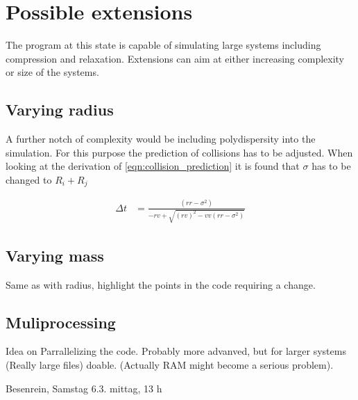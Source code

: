 
\section{Possible extensions}
\label{sec:simulation_ext}
The program at this state is capable of simulating large systems including compression and relaxation. Extensions can aim at either increasing complexity or size of the systems. 

\subsection{Varying radius}
\label{sec:extension_radius}
A further notch of complexity would be including polydispersity into the simulation. For this purpose the prediction of collisions has to be adjusted. When looking at the derivation of \autoref{eqn:collision_prediction} it is found that $\sigma$ has to be changed to $R_i+R_j$ 

\begin{align}
\label{eqn:collision_prediction}
\Delta t &= \frac{(rr - \sigma^2 )}{ - rv + \sqrt{ (rv)^2  - vv (rr - \sigma^2 )}}
\end{align} 


\subsection{Varying mass}
\label{sec:extension_mass}
Same as with radius, highlight the points in the code requiring a change.

\subsection{Muliprocessing}
\label{sec:extension_MP}
Idea on Parrallelizing the code. Probably more advanved, but for larger systems (Really large files) doable. (Actually RAM might become a serious problem).

Besenrein, Samstag 6.3.  mittag, 13 h 


